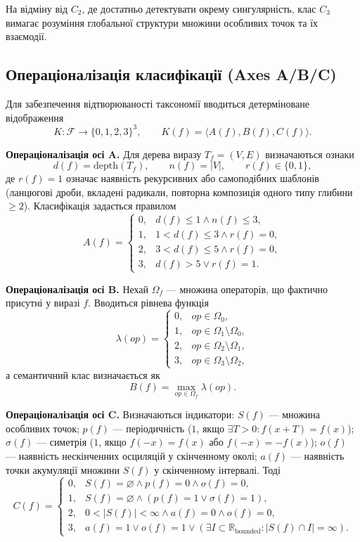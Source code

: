 \documentclass[11pt]{article}
\begin{document}
На відміну від $C_2$, де достатньо детектувати окрему сингулярність, клас $C_3$ вимагає розуміння глобальної структури множини особливих точок та їх взаємодії.

\subsection{Операціоналізація класифікації (Axes A/B/C)}

Для забезпечення відтворюваності таксономії вводиться детерміноване відображення
\[
K:\mathcal{F}\to\{0,1,2,3\}^3,\qquad K(f)=\langle A(f),B(f),C(f)\rangle.
\]

\textbf{Операціоналізація осі A.}
Для дерева виразу $T_f=(V,E)$ визначаються ознаки
\[
d(f)=\mathrm{depth}(T_f),\qquad n(f)=|V|,\qquad r(f)\in\{0,1\},
\]
де $r(f)=1$ означає наявність рекурсивних або самоподібних шаблонів (ланцюгові дроби, вкладені радикали, повторна композиція одного типу глибини $\ge 2$). Класифікація задається правилом
\[
A(f)=
\begin{cases}
0,& d(f)\le 1 \land n(f)\le 3,\\
1,& 1<d(f)\le 3 \land r(f)=0,\\
2,& 3<d(f)\le 5 \land r(f)=0,\\
3,& d(f)>5 \lor r(f)=1.
\end{cases}
\]

\textbf{Операціоналізація осі B.}
Нехай $\Omega_f$ --- множина операторів, що фактично присутні у виразі $f$. Вводиться рівнева функція
\[
\lambda(op)=
\begin{cases}
0,& op\in\Omega_0,\\
1,& op\in\Omega_1\setminus\Omega_0,\\
2,& op\in\Omega_2\setminus\Omega_1,\\
3,& op\in\Omega_3\setminus\Omega_2,
\end{cases}
\]
а семантичний клас визначається як
\[
B(f)=\max_{op\in\Omega_f}\lambda(op).
\]

\textbf{Операціоналізація осі C.}
Визначаються індикатори: $S(f)$ --- множина особливих точок; $p(f)$ --- періодичність ($1$, якщо $\exists T>0: f(x+T)=f(x)$); $\sigma(f)$ --- симетрія ($1$, якщо $f(-x)=f(x)$ або $f(-x)=-f(x)$); $o(f)$ --- наявність нескінченних осциляцій у скінченному околі; $a(f)$ --- наявність точки акумуляції множини $S(f)$ у скінченному інтервалі. Тоді
\[
C(f)=
\begin{cases}
0,& S(f)=\varnothing \land p(f)=0 \land o(f)=0,\\
1,& S(f)=\varnothing \land (p(f)=1 \lor \sigma(f)=1),\\
2,& 0<|S(f)|<\infty \land a(f)=0 \land o(f)=0,\\
3,& a(f)=1 \lor o(f)=1 \lor (\exists I\subset\mathbb{R}_{\text{bounded}}:|S(f)\cap I|=\infty).
\end{cases}
\]
\end{document}
